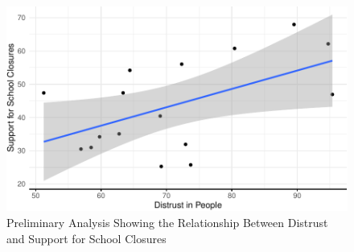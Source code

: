 \documentclass[
  11pt,
]{article}
\begin{document}
\begin{figure}
\includegraphics[width=0.8\linewidth]{write_up_test_files/figure-latex/yougov-1} \caption{Preliminary Analysis Showing the Relationship Between Distrust and Support for School Closures}\label{fig:yougov}
\end{figure}
\end{document}
